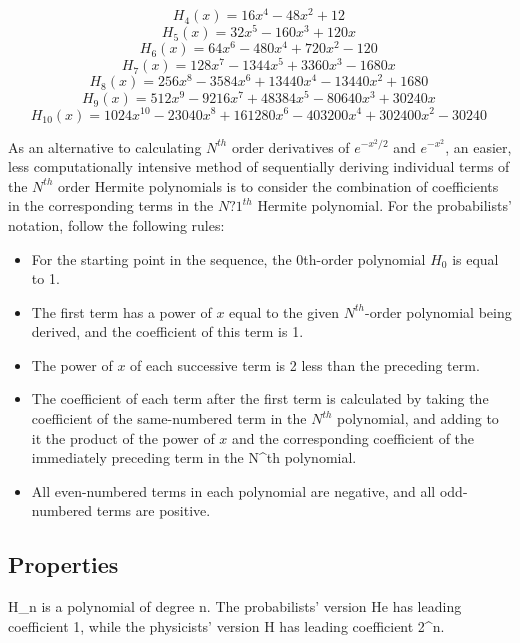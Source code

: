 \begin{equation}H_4(x)=16x^4-48x^2+12\,\end{equation}
\begin{equation}H_5(x)=32x^5-160x^3+120x\,\end{equation}
\begin{equation}H_6(x)=64x^6-480x^4+720x^2-120\,\end{equation}
\begin{equation}H_7(x)=128x^7-1344x^5+3360x^3-1680x\,\end{equation}
\begin{equation}H_8(x)=256x^8-3584x^6+13440x^4-13440x^2+1680\,\end{equation}
\begin{equation}H_9(x)=512x^9-9216x^7+48384x^5-80640x^3+30240x\,\end{equation}
\begin{equation}H_{10}(x)=1024x^{10}-23040x^8+161280x^6-403200x^4+302400x^2-30240\,\end{equation}

As an alternative to calculating $N^{th}$ order derivatives of $e^{-x^2/2}$  and $e^{-x^2}$, 
an easier, less computationally intensive method of sequentially deriving individual terms of 
the $N^{th}$ order Hermite polynomials is to consider the combination of coefficients in the 
corresponding terms in the $N?1^{th}$ Hermite polynomial. For the probabilists' notation, follow 
the following rules:
\begin{itemize}
\item For the starting point in the sequence, the 0th-order polynomial $H_0$ is equal to 1.
\item The first term has a power of $x$ equal to the given $N^{th}$-order polynomial being derived, 
and the coefficient of this term is 1.
\item The power of $x$ of each successive term is 2 less than the preceding term.
\item The coefficient of each term after the first term is calculated by taking the coefficient 
of the same-numbered term in the $N^{th}$ polynomial, and adding to it the product 
of the power of $x$ and the corresponding coefficient of the immediately preceding term in the N^{th} polynomial.
\item All even-numbered terms in each polynomial are negative, and all odd-numbered terms are positive.
\end{itemize}


\subsection{Properties}
H_n is a polynomial of degree n. The probabilists' version He has leading coefficient 1, 
while the physicists' version H has leading coefficient 2^n.

